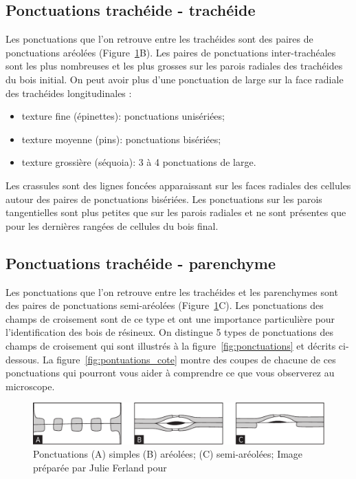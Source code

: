 \subsection{Ponctuations trachéide - trachéide}

Les ponctuations que l'on retrouve entre les trachéides sont des paires de ponctuations aréolées (Figure~\ref{fig:ponctuations2}B). Les paires de ponctuations inter-trachéales sont les plus nombreuses et les plus grosses sur les parois radiales des trachéides du bois initial. On peut avoir plus d'une ponctuation de large sur la face radiale des trachéides longitudinales : 

\begin{itemize}
\item texture fine (épinettes):	ponctuations unisériées;
\item texture moyenne (pins):	ponctuations bisériées;
\item texture grossière (séquoia):	3 à 4 ponctuations de large.
\end{itemize}

Les crassules sont des lignes foncées apparaissant sur les faces radiales des cellules autour des paires de ponctuations bisériées. Les ponctuations sur les parois tangentielles sont plus petites que sur les parois radiales et ne sont présentes que pour les dernières rangées de cellules du bois final. 

\subsection{Ponctuations trachéide - parenchyme}

Les ponctuations que l'on retrouve entre les trachéides et les parenchymes sont des paires de ponctuations semi-aréolées (Figure~\ref{fig:ponctuations2}C). Les ponctuations des champs de croisement sont de ce type et ont une importance particulière pour l'identification des bois de résineux. On distingue 5 types de ponctuations des champs de croisement qui sont illustrés à la figure~\ref{fig:ponctuations} et décrits ci-dessous. La figure~\ref{fig:pontuations_cote} montre des coupes de chacune de ces ponctuations qui pourront vous aider à comprendre ce que vous observerez au microscope.

\begin{figure}[h]
\centering
\includegraphics[scale=0.7]{img/ch3_ponctuations2}
\caption{Ponctuations (A) simples (B) aréolées; (C) semi-aréolées; Image préparée par Julie Ferland pour \cite{achim2010dendroecologie}}
\label{fig:ponctuations2}
\end{figure}


